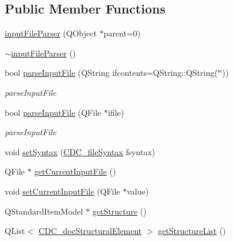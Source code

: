 \subsection*{Public Member Functions}
\begin{DoxyCompactItemize}
\item 
\hyperlink{classinput_file_parser_ad6dae9aa76c40b59ebb5471614815380}{input\+File\+Parser} (Q\+Object $\ast$parent=0)
\item 
\hyperlink{classinput_file_parser_acedec7ed52e2b6222c8cb21844552e9e}{$\sim$input\+File\+Parser} ()
\item 
bool \hyperlink{classinput_file_parser_ad632f2b78c34b72cbaf8105b8762cf9f}{parse\+Input\+File} (Q\+String ifcontents=Q\+String\+::\+Q\+String(\char`\"{}\char`\"{}))
\begin{DoxyCompactList}\small\item\em parse\+Input\+File \end{DoxyCompactList}\item 
bool \hyperlink{classinput_file_parser_a5822704ff80b0fcbfd18f90d0c5d73e9}{parse\+Input\+File} (Q\+File $\ast$ifile)
\begin{DoxyCompactList}\small\item\em parse\+Input\+File \end{DoxyCompactList}\item 
void \hyperlink{classinput_file_parser_afcdec3f3ebb30d601441602e7c6aefe7}{set\+Syntax} (\hyperlink{cdcdefs_8h_ab649dd84a9663b16384131638df4d313}{C\+D\+C\+\_\+file\+Syntax} fsyntax)
\item 
Q\+File $\ast$ \hyperlink{classinput_file_parser_aeba4ba60f2dd40f1e574d57453973904}{get\+Current\+Input\+File} ()
\item 
void \hyperlink{classinput_file_parser_a23af707bf06a90d1e81458415f1d3b96}{set\+Current\+Input\+File} (Q\+File $\ast$value)
\item 
Q\+Standard\+Item\+Model $\ast$ \hyperlink{classinput_file_parser_abd1a6e741e6320d407d8bb4f7d426fff}{get\+Structure} ()
\item 
Q\+List$<$ \hyperlink{struct_c_d_c__doc_structural_element}{C\+D\+C\+\_\+doc\+Structural\+Element} $>$ \hyperlink{classinput_file_parser_ab28a0b22999c9a20ec8c3a72a2c40a7e}{get\+Structure\+List} ()
\end{DoxyCompactItemize}
